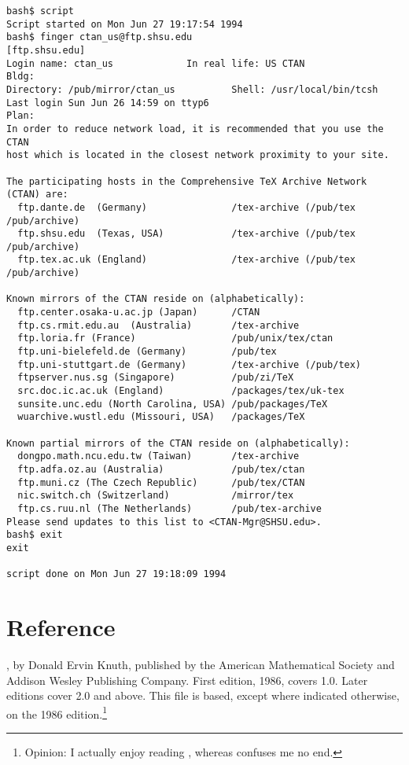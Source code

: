\begin{verbatim}
bash$ script
Script started on Mon Jun 27 19:17:54 1994
bash$ finger ctan_us@ftp.shsu.edu
[ftp.shsu.edu]
Login name: ctan_us   			In real life: US CTAN
Bldg:  			 
Directory: /pub/mirror/ctan_us      	Shell: /usr/local/bin/tcsh
Last login Sun Jun 26 14:59 on ttyp6
Plan:
In order to reduce network load, it is recommended that you use the CTAN
host which is located in the closest network proximity to your site.  

The participating hosts in the Comprehensive TeX Archive Network (CTAN) are:
  ftp.dante.de  (Germany)               /tex-archive (/pub/tex /pub/archive)
  ftp.shsu.edu  (Texas, USA)            /tex-archive (/pub/tex /pub/archive)
  ftp.tex.ac.uk (England)               /tex-archive (/pub/tex /pub/archive)

Known mirrors of the CTAN reside on (alphabetically):
  ftp.center.osaka-u.ac.jp (Japan)      /CTAN
  ftp.cs.rmit.edu.au  (Australia)       /tex-archive
  ftp.loria.fr (France)                 /pub/unix/tex/ctan
  ftp.uni-bielefeld.de (Germany)        /pub/tex
  ftp.uni-stuttgart.de (Germany)        /tex-archive (/pub/tex)
  ftpserver.nus.sg (Singapore)          /pub/zi/TeX
  src.doc.ic.ac.uk (England)            /packages/tex/uk-tex
  sunsite.unc.edu (North Carolina, USA)	/pub/packages/TeX
  wuarchive.wustl.edu (Missouri, USA)   /packages/TeX

Known partial mirrors of the CTAN reside on (alphabetically):
  dongpo.math.ncu.edu.tw (Taiwan)       /tex-archive
  ftp.adfa.oz.au (Australia)            /pub/tex/ctan
  ftp.muni.cz (The Czech Republic)      /pub/tex/CTAN
  nic.switch.ch (Switzerland)           /mirror/tex
  ftp.cs.ruu.nl (The Netherlands)       /pub/tex-archive
Please send updates to this list to <CTAN-Mgr@SHSU.edu>.
bash$ exit
exit

script done on Mon Jun 27 19:18:09 1994
\end{verbatim}


\section*{Reference}%

\MFbook{}, by Donald Ervin {\sc Knuth}, published by the
American Mathematical Society and Addison Wesley Publishing Company.
First edition, 1986, covers \MF{} 1.0.
Later editions cover \MF{} 2.0 and above.
This file is based, except where indicated otherwise,
on the 1986 edition.\footnote
{Opinion:  I actually enjoy reading \MFbook{},
whereas \TeXbook{} confuses me no end.}


